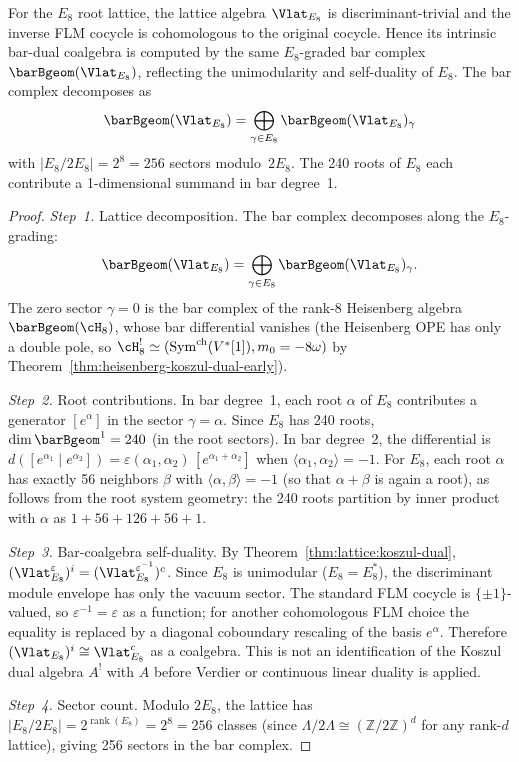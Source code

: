 \begin{proposition}
\label{prop:lattice:bar-E8}
For the $E_8$ root lattice, the lattice algebra $\Vlat_{E_8}$ is
discriminant-trivial and the inverse FLM cocycle is cohomologous to
the original cocycle. Hence its intrinsic bar-dual coalgebra is
computed by the same
$E_8$-graded bar complex $\barBgeom(\Vlat_{E_8})$, reflecting the
unimodularity and self-duality of $E_8$.
The bar complex decomposes as
\[
\barBgeom(\Vlat_{E_8})
= \bigoplus_{\gamma \in E_8} \barBgeom(\Vlat_{E_8})_\gamma
\]
with $|E_8/2E_8| = 2^8 = 256$ sectors modulo~$2E_8$. The 240 roots of
$E_8$ each contribute a 1-dimensional summand in bar degree~1.
\end{proposition}

\begin{proof}
\emph{Step~1.} Lattice decomposition.
The bar complex decomposes along the $E_8$-grading:
\[
\barBgeom(\Vlat_{E_8}) = \bigoplus_{\gamma \in E_8} \barBgeom(\Vlat_{E_8})_\gamma.
\]
The zero sector $\gamma = 0$ is the bar complex of the rank-8 Heisenberg algebra
$\barBgeom(\cH_8)$, whose bar differential vanishes (the Heisenberg OPE has only
a double pole, so
$\cH_8^!\simeq(\mathrm{Sym}^{\mathrm{ch}}(V^*[1]),m_0=-8\omega)$
by Theorem~\ref{thm:heisenberg-koszul-dual-early}).

\emph{Step~2.} Root contributions.
In bar degree~1, each root $\alpha$ of $E_8$ contributes a generator $[e^\alpha]$ in the sector $\gamma = \alpha$. Since $E_8$ has 240 roots, $\dim \barBgeom^1 = 240$ (in the root sectors). In bar degree~2, the differential is $d([e^{\alpha_1} \mid e^{\alpha_2}]) = \varepsilon(\alpha_1,\alpha_2)\,[e^{\alpha_1+\alpha_2}]$ when $\langle\alpha_1,\alpha_2\rangle = -1$. For $E_8$, each root $\alpha$ has exactly 56 neighbors $\beta$ with $\langle\alpha,\beta\rangle = -1$ (so that $\alpha+\beta$ is again a root), as follows from the root system geometry: the 240 roots partition by inner product with $\alpha$ as $1 + 56 + 126 + 56 + 1$.

\emph{Step~3.} Bar-coalgebra self-duality.
By Theorem~\ref{thm:lattice:koszul-dual},
$(\Vlat_{E_8}^\varepsilon)^i =
(\Vlat_{E_8}^{\varepsilon^{-1}})^c$. Since $E_8$ is unimodular
($E_8=E_8^*$), the discriminant module envelope has only the
vacuum sector. The standard FLM cocycle is $\{\pm1\}$-valued, so
$\varepsilon^{-1}=\varepsilon$ as a function; for another
cohomologous FLM choice the equality is replaced by a diagonal
coboundary rescaling of the basis $e^\alpha$. Therefore
$(\Vlat_{E_8})^i\cong \Vlat_{E_8}^c$ as a coalgebra. This is not an
identification of the Koszul dual algebra $A^!$ with $A$ before
Verdier or continuous linear duality is applied.

\emph{Step~4.} Sector count.
Modulo $2E_8$, the lattice has $|E_8/2E_8| = 2^{\operatorname{rank}(E_8)} = 2^8 = 256$ classes (since $\Lambda/2\Lambda \cong (\mathbb{Z}/2\mathbb{Z})^d$ for any rank-$d$ lattice), giving 256 sectors in the bar complex.
\end{proof}

